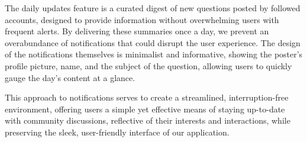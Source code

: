 The daily updates feature is a curated digest of new questions posted by followed accounts, designed to provide information without overwhelming users with frequent alerts. By delivering these summaries once a day, we prevent an overabundance of notifications that could disrupt the user experience. The design of the notifications themselves is minimalist and informative, showing the poster’s profile picture, name, and the subject of the question, allowing users to quickly gauge the day's content at a glance.

This approach to notifications serves to create a streamlined, interruption-free environment, offering users a simple yet effective means of staying up-to-date with community discussions, reflective of their interests and interactions, while preserving the sleek, user-friendly interface of our application.

